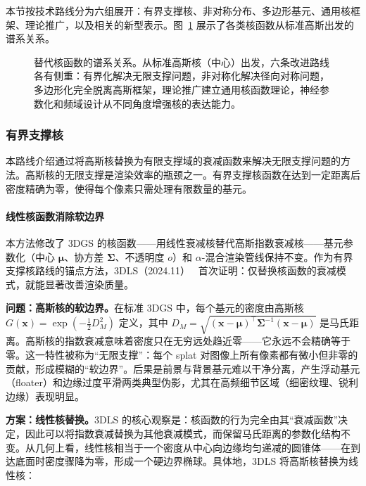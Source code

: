 本节按技术路线分为六组展开：有界支撑核、非对称分布、多边形基元、通用核框架、理论推广，以及相关的新型表示。图~\ref{fig:03_kernel} 展示了各类核函数从标准高斯出发的谱系关系。

\begin{figure}[htbp]
\centering
\resizebox{0.95\textwidth}{!}{}
\caption{替代核函数的谱系关系。从标准高斯核（中心）出发，六条改进路线各有侧重：有界化解决无限支撑问题，非对称化解决径向对称问题，多边形化完全脱离高斯框架，理论推广建立通用核函数理论，神经参数化和频域设计从不同角度增强核的表达能力。}
\label{fig:03_kernel}
\end{figure}

\subsubsection{有界支撑核}

本路线介绍通过将高斯核替换为有限支撑域的衰减函数来解决无限支撑问题的方法。高斯核的无限支撑是渲染效率的瓶颈之一。有界支撑核函数在达到一定距离后密度精确为零，使得每个像素只需处理有限数量的基元。

\paragraph{线性核函数消除软边界}

本方法修改了 3DGS 的核函数——用线性衰减核替代高斯指数衰减核——基元参数化（中心 $\boldsymbol{\mu}$、协方差 $\boldsymbol{\Sigma}$、不透明度 $o$）和 $\alpha$-混合渲染管线保持不变。作为有界支撑核路线的锚点方法，3DLS（2024.11）~\cite{2411_12440} 首次证明：仅替换核函数的衰减模式，就能显著改善渲染质量。

\textbf{问题：高斯核的软边界。}在标准 3DGS 中，每个基元的密度由高斯核 $G(\mathbf{x}) = \exp(-\frac{1}{2}D_M^2)$ 定义，其中 $D_M = \sqrt{(\mathbf{x}-\boldsymbol{\mu})^\top \boldsymbol{\Sigma}^{-1}(\mathbf{x}-\boldsymbol{\mu})}$ 是马氏距离。高斯核的指数衰减意味着密度只在无穷远处趋近零——它永远不会精确等于零。这一特性被称为``无限支撑''：每个 splat 对图像上所有像素都有微小但非零的贡献，形成模糊的``软边界''。后果是前景与背景基元难以干净分离，产生浮动基元（floater）和边缘过度平滑两类典型伪影，尤其在高频细节区域（细密纹理、锐利边缘）表现明显。

\textbf{方案：线性核替换。}3DLS 的核心观察是：核函数的行为完全由其``衰减函数''决定，因此可以将指数衰减替换为其他衰减模式，而保留马氏距离的参数化结构不变。从几何上看，线性核相当于一个密度从中心向边缘均匀递减的圆锥体——在到达底面时密度骤降为零，形成一个硬边界椭球。具体地，3DLS 将高斯核替换为线性核：

